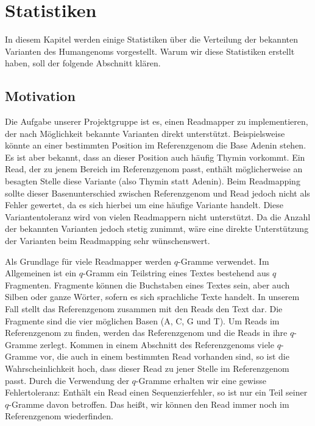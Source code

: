\chapter{Statistiken}
\label{sec:stats}

In diesem Kapitel werden einige Statistiken über die Verteilung der bekannten Varianten des Humangenoms vorgestellt. Warum wir diese Statistiken erstellt haben, soll der folgende Abschnitt klären.

\section{Motivation}
\label{sec:stats:motivation}
Die Aufgabe unserer Projektgruppe ist es, einen Readmapper zu implementieren, der nach Möglichkeit bekannte Varianten direkt unterstützt. Beispielsweise könnte an einer bestimmten Position im Referenzgenom die Base Adenin stehen. Es ist aber bekannt, dass an dieser Position auch häufig Thymin vorkommt. Ein Read, der zu jenem Bereich im Referenzgenom passt, enthält möglicherweise an besagten Stelle diese Variante (also Thymin statt Adenin). Beim Readmapping sollte dieser Basenunterschied zwischen Referenzgenom und Read jedoch nicht als Fehler gewertet, da es sich hierbei um eine häufige Variante handelt. Diese Variantentoleranz wird von vielen Readmappern nicht unterstützt. Da die Anzahl der bekannten Varianten jedoch stetig zunimmt, wäre eine direkte Unterstützung der Varianten beim Readmapping sehr wünschenswert.

Als Grundlage für viele Readmapper werden $q$-Gramme verwendet. Im Allgemeinen ist ein $q$-Gramm ein Teilstring eines Textes bestehend aus $q$ Fragmenten. Fragmente können die Buchstaben eines Textes sein, aber auch Silben oder ganze Wörter, sofern es sich sprachliche Texte handelt. In unserem Fall stellt das Referenzgenom zusammen mit den Reads den Text dar. Die Fragmente sind die vier möglichen Basen (A, C, G und T). Um Reads im Referenzgenom zu finden, werden das Referenzgenom und die Reads in ihre $q$-Gramme zerlegt. Kommen in einem Abschnitt des Referenzgenoms viele $q$-Gramme vor, die auch in einem bestimmten Read vorhanden sind, so ist die Wahrscheinlichkeit hoch, dass dieser Read zu jener Stelle im Referenzgenom passt. Durch die Verwendung der $q$-Gramme erhalten wir eine gewisse Fehlertoleranz: Enthält ein Read einen Sequenzierfehler, so ist nur ein Teil seiner $q$-Gramme davon betroffen. Das heißt, wir können den Read immer noch im Referenzgenom wiederfinden.

